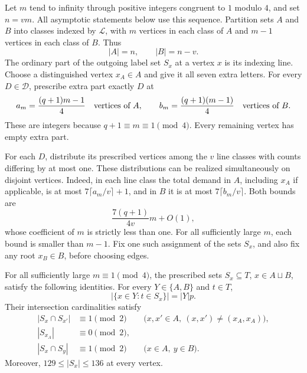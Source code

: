 Let \(m\) tend to infinity through positive integers congruent to
\(1\) modulo \(4\), and set \(n=vm\).  All asymptotic statements
below use this sequence.  Partition sets \(A\) and \(B\) into classes
indexed by \(\mathcal L\), with \(m\) vertices in each class of
\(A\) and \(m-1\) vertices in each class of \(B\).  Thus
\[
 |A|=n,\qquad |B|=n-v.
\]
The ordinary part of the outgoing label set \(S_x\) at a vertex
\(x\) is its indexing line.  Choose a distinguished vertex
\(x_A\in A\) and give it all seven extra letters.  For every
\(D\in\mathcal D\), prescribe extra part exactly \(D\) at
\begin{equation}\label{eq:extra-counts}
 a_m=\frac{(q+1)m-1}{4}\quad\hbox{vertices of }A,
 \qquad
 b_m=\frac{(q+1)(m-1)}4\quad\hbox{vertices of }B.
\end{equation}
These are integers because \(q+1\equiv m\equiv1\pmod4\).
Every remaining vertex has empty extra part.

For each \(D\), distribute its prescribed vertices among the \(v\)
line classes with counts differing by at most one.  These distributions
can be realized simultaneously on disjoint vertices.  Indeed, in each
line class the total demand in \(A\), including \(x_A\) if applicable,
is at most \(7\lceil a_m/v\rceil+1\), and in \(B\) it is at most
\(7\lceil b_m/v\rceil\).  Both bounds are
\[
 \frac{7(q+1)}{4v}m+O(1),
\]
whose coefficient of \(m\) is strictly less than one.  For all
sufficiently large \(m\), each bound is smaller than \(m-1\).
Fix one such assignment of the sets \(S_x\), and also fix any root
\(x_B\in B\), before choosing edges.

\begin{proposition}\label{prop:types}
For all sufficiently large \(m\equiv1\pmod4\), the prescribed sets
\(S_x\subseteq T\), \(x\in A\sqcup B\), satisfy the following
identities.  For every \(Y\in\{A,B\}\) and \(t\in T\),
\begin{equation}\label{eq:label-balance}
 \bigl|\{x\in Y:t\in S_x\}\bigr|=|Y|p.
\end{equation}
Their intersection cardinalities satisfy
\begin{equation}\label{eq:type-parity}
 \begin{aligned}
 |S_x\cap S_{x'}|&\equiv1\pmod2
 &&\bigl(x,x'\in A,\ (x,x')\ne(x_A,x_A)\bigr),\\
 |S_{x_A}|&\equiv0\pmod2,\\
 |S_x\cap S_y|&\equiv1\pmod2
 &&\bigl(x\in A,\ y\in B\bigr).
 \end{aligned}
\end{equation}
Moreover, \(129\le |S_x|\le136\) at every vertex.
\end{proposition}

